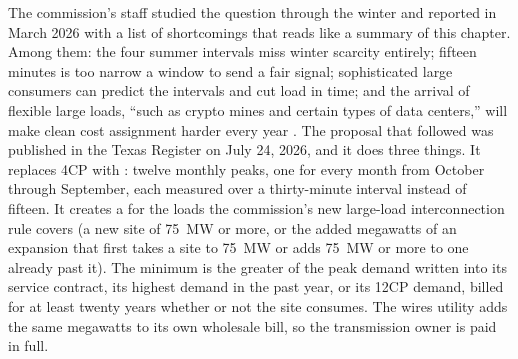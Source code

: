 The commission's staff studied the question through the winter and reported in March 2026 with a list of shortcomings that reads like a summary of this chapter. Among them: the four summer intervals miss winter scarcity entirely; fifteen minutes is too narrow a window to send a fair signal; sophisticated large consumers can predict the intervals and cut load in time; and the arrival of flexible large loads, ``such as crypto mines and certain types of data centers,'' will make clean cost assignment harder every year \autocite{puctstaff2026draftreport}. %
The proposal that followed was published in the Texas Register on July 24, 2026, and it does three things. %
It replaces 4CP with : twelve monthly peaks, one for every month from October through September, each measured over a thirty-minute interval instead of fifteen. %
It creates a  for the loads the commission's new large-load interconnection rule covers (a new site of 75~MW or more, or the added megawatts of an expansion that first takes a site to 75~MW or adds 75~MW or more to one already past it). The minimum is the greater of the peak demand written into its service contract, its highest demand in the past year, or its 12CP demand, billed for at least twenty years whether or not the site consumes. The wires utility adds the same megawatts to its own wholesale bill, so the transmission owner is paid in full. %
